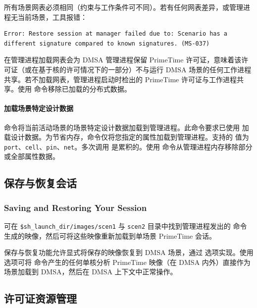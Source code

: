 
所有场景网表必须相同（约束与工作条件可不同）。若有任何网表差异，或管理进程无当前场景，工具报错：
\begin{lstlisting}
Error: Restore session at manager failed due to: Scenario has a
different signature compared to known signatures. (MS-037)
\end{lstlisting}

在管理进程加载网表会为 DMSA 管理进程保留 PrimeTime 许可证，意味着该许可证（或在基于核的许可情况下的一部分）不与运行 DMSA 场景的任何工作进程共享。若不加载网表，管理进程启动时检出的 PrimeTime 许可证与工作进程共享。使用  命令移除已加载的分布式数据。

\paragraph{加载场景特定设计数据}
 命令将当前活动场景的场景特定设计数据加载到管理进程。此命令要求已使用  加载设计数据。为节省内存，命令仅将您指定的属性加载到管理进程。支持的  值为 \texttt{port}、\texttt{cell}、\texttt{pin}、\texttt{net}。多次调用  是累积的。使用  命令从管理进程内存移除部分或全部属性数据。

\subsection{保存与恢复会话}
\subsubsection*{Saving and Restoring Your Session}

可在 \texttt{\$sh\_launch\_dir/images/scen1} 与 \texttt{scen2} 目录中找到管理进程发出的  命令生成的映像，然后可将这些映像重新加载到单场景 PrimeTime 会话。

保存与恢复功能允许显式将保存的映像恢复到 DMSA 场景，通过  选项实现。使用  选项可将  命令产生的任何单核分析 PrimeTime 映像（在 DMSA 内外）直接作为场景加载到 DMSA，然后在 DMSA 上下文中正常操作。

\subsection{许可证资源管理}
